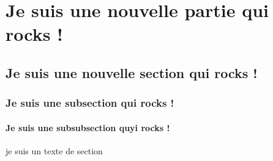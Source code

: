 




\maketitle

\newpage
\tableofcontents 

\newpage
\chapter{Je suis une nouvelle partie qui rocks !}
\section{Je suis une nouvelle section qui rocks !}
\subsection{Je suis une subsection qui rocks !}
\subsubsection{Je suis une subsubsection quyi rocks !}
je suis un texte de section 


